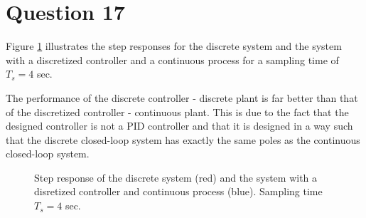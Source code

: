 \section{Question 17}

Figure \ref{fig:Q17.response} illustrates the step responses for the discrete
system and the system with a discretized controller and a continuous process
for a sampling time of $T_s = 4$ sec.

The performance of the discrete controller - discrete plant is far better than
that of the discretized controller - continuous plant. This is due to the fact
that the designed controller is not a PID controller and that it is designed in
a way such that the discrete closed-loop system has exactly the same poles as
the continuous closed-loop system.

\begin{figure}[H]\centering
	\centering
	\scalebox{1}{}
  \caption{Step response of the discrete system (red) and the system with a
    disretized controller and continuous process (blue). Sampling time $T_s=4$ sec.}
  \label{fig:Q17.response}
\end{figure}
